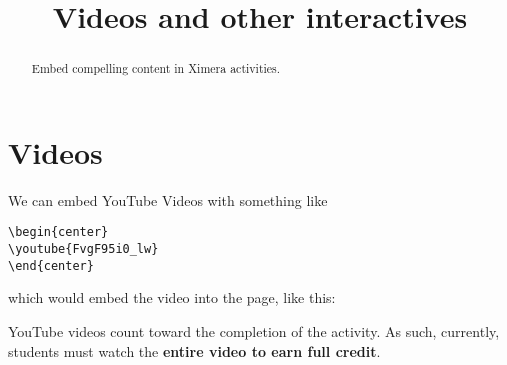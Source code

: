 \documentclass{ximera}
\title{Videos and other interactives}
\begin{document}
\begin{abstract}
  Embed compelling content in Ximera activities.
\end{abstract}
\maketitle

\section{Videos}

We can embed YouTube Videos with something like
\begin{verbatim}
\begin{center}
\youtube{FvgF95i0_lw}
\end{center}
\end{verbatim}
which would embed the video into the page, like this:
\begin{center}
\end{center}

\begin{warning}
  YouTube videos count toward the completion of the activity. As such,
  currently, students must watch the \textbf{entire video to earn full credit}.
\end{warning}
\end{document}
